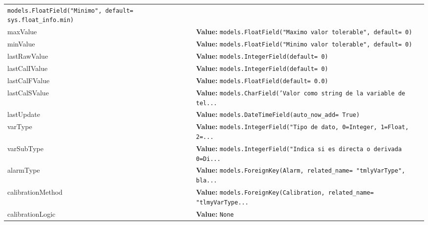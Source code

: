 \begin{longtable}{|p{\varnamewidth}|p{\vardescrwidth}|l}
{\tt models.FloatField("Minimo", default= sys.float\_info.min)}&\\
\cline{1-2}
\raggedright m\-a\-x\-V\-a\-l\-u\-e\- & \raggedright \textbf{Value:} 
{\tt models.FloatField("Maximo valor tolerable", default= 0)}&\\
\cline{1-2}
\raggedright m\-i\-n\-V\-a\-l\-u\-e\- & \raggedright \textbf{Value:} 
{\tt models.FloatField("Minimo valor tolerable", default= 0)}&\\
\cline{1-2}
\raggedright l\-a\-s\-t\-R\-a\-w\-V\-a\-l\-u\-e\- & \raggedright \textbf{Value:} 
{\tt models.IntegerField(default= 0)}&\\
\cline{1-2}
\raggedright l\-a\-s\-t\-C\-a\-l\-I\-V\-a\-l\-u\-e\- & \raggedright \textbf{Value:} 
{\tt models.IntegerField(default= 0)}&\\
\cline{1-2}
\raggedright l\-a\-s\-t\-C\-a\-l\-F\-V\-a\-l\-u\-e\- & \raggedright \textbf{Value:} 
{\tt models.FloatField(default= 0.0)}&\\
\cline{1-2}
\raggedright l\-a\-s\-t\-C\-a\-l\-S\-V\-a\-l\-u\-e\- & \raggedright \textbf{Value:} 
{\tt models.CharField('Valor como string de la variable de tel\texttt{...}}&\\
\cline{1-2}
\raggedright l\-a\-s\-t\-U\-p\-d\-a\-t\-e\- & \raggedright \textbf{Value:} 
{\tt models.DateTimeField(auto\_now\_add= True)}&\\
\cline{1-2}
\raggedright v\-a\-r\-T\-y\-p\-e\- & \raggedright \textbf{Value:} 
{\tt models.IntegerField("Tipo de dato, 0=Integer, 1=Float, 2=\texttt{...}}&\\
\cline{1-2}
\raggedright v\-a\-r\-S\-u\-b\-T\-y\-p\-e\- & \raggedright \textbf{Value:} 
{\tt models.IntegerField("Indica si es directa o derivada 0=Di\texttt{...}}&\\
\cline{1-2}
\raggedright a\-l\-a\-r\-m\-T\-y\-p\-e\- & \raggedright \textbf{Value:} 
{\tt models.ForeignKey(Alarm, related\_name= "tmlyVarType", bla\texttt{...}}&\\
\cline{1-2}
\raggedright c\-a\-l\-i\-b\-r\-a\-t\-i\-o\-n\-M\-e\-t\-h\-o\-d\- & \raggedright \textbf{Value:} 
{\tt models.ForeignKey(Calibration, related\_name= "tlmyVarType\texttt{...}}&\\
\cline{1-2}
\raggedright c\-a\-l\-i\-b\-r\-a\-t\-i\-o\-n\-L\-o\-g\-i\-c\- & \raggedright \textbf{Value:} 
{\tt None}&\\
\cline{1-2}
\end{longtable}

